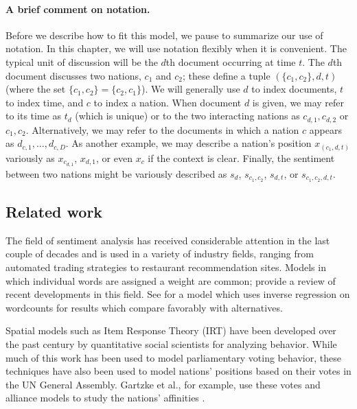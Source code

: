 \paragraph{A brief comment on notation.} Before we describe how to fit
this model, we pause to summarize our use of notation.  In this
chapter, we will use notation flexibly when it is convenient.  The
typical unit of discussion will be the $d$th document occurring at
time $t$.  The $d$th document discusses two nations, $c_1$ and
$c_2$; these define a tuple $(\{ c_1, c_2 \}, d, t)$ (where the set
$\{ c_1, c_2 \} = \{ c_2, c_1 \}$).  We will generally use $d$ to
index documents, $t$ to index time, and $c$ to index a nation.  When
document $d$ is given, we may refer to its time as $t_d$ (which is
unique) or to the two interacting nations as $c_{d,1},c_{d,2}$ or
$c_1,c_2$.  Alternatively, we may refer to the documents in which a
nation $c$ appears as $d_{c,1}, \ldots, d_{c,D}$.  As another
example, we may describe a nation's position $x_{(c_1,d,t)}$
variously as $x_{c_{d,1}}$, $x_{d,1}$, or even $x_c$ if the context is
clear. Finally, the sentiment between two nations might be variously
described as $s_d$, $s_{c_1,c_2}$, $s_{d,t}$, or $s_{c_1,c_2,d,t}$.

\subsection*{Related work}

The field of sentiment analysis has received considerable attention in
the last couple of decades and is used in a variety of industry
fields, ranging from automated trading strategies to restaurant
recommendation sites.  Models in which individual words are assigned a
weight are common; \cite{pang:2008} provide a review of recent
developments in this field.  See \cite{taddy:2012} for a model which
uses inverse regression on wordcounts for results which compare
favorably with alternatives.

Spatial models such as Item Response Theory (IRT) have been developed
over the past century by quantitative social scientists for analyzing
behavior.  While much of this work has been used to model
parliamentary voting behavior, these techniques have also been used to
model nations' positions based on their votes in the UN General
Assembly. Gartzke et al., for example, use these votes and alliance
models to study the nations' affinities \citep{gartzke:1998}.

